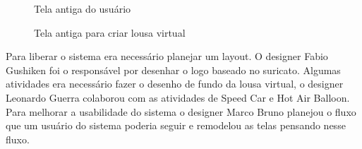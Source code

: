 \begin{figure}[H]
  \centering
  \caption{Tela antiga do usuário}\label{figura:indexAntigo}
\end{figure}

\begin{figure}[H]
  \centering
  \caption{Tela antiga para criar lousa virtual}\label{figura:criarAntigo}
\end{figure}

Para liberar o sistema era necessário planejar um layout. O designer Fabio Gushiken foi o responsável por desenhar o logo baseado no suricato. Algumas atividades era necessário fazer o desenho de fundo da lousa virtual, o designer Leonardo Guerra colaborou com as atividades de Speed Car e Hot Air Balloon. Para melhorar a usabilidade do sistema o designer Marco Bruno planejou o fluxo que um usuário do sistema poderia seguir e remodelou as telas pensando nesse fluxo.

